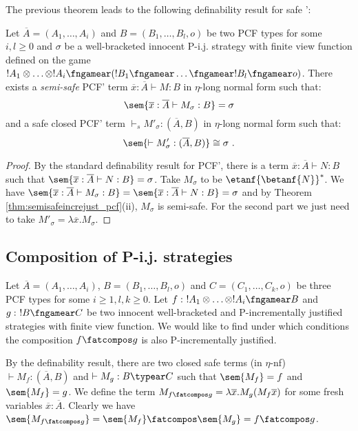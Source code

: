 The previous theorem leads to the following definability result for safe \pcf':
\begin{proposition}
\label{prop:safetydefinability}
Let $\overline{A}=(A_1,\ldots, A_i)$ and $B =(B_1, \ldots, B_l,o)$ be two PCF types for some $i,l\geq 0$ and $\sigma$ be a well-bracketed innocent
P-i.j. strategy with finite view function defined on the game $!A_1 \otimes \ldots \otimes !A_i \fngamear (!B_1 \fngamear \ldots \fngamear !B_l \fngamear o) $. There exists a \emph{semi-safe} PCF' term $\overline{x} : \overline{A} \vdash M : B$ in $\eta$-long normal form such that:
$$ \sem{\overline{x} : \overline{A} \vdash M_\sigma : B} = \sigma $$
and a safe closed PCF' term $\vdash_s M'_\sigma : (\overline{A},B)$ in $\eta$-long normal form such that:
$$ \sem{\vdash M'_\sigma : (\overline{A},B)} \cong \sigma \ .$$
\end{proposition}
\begin{proof}
By the standard definability result for PCF', there is a term $\overline{x} : \overline{A} \vdash N : B$ such that $\sem{\overline{x} :\overline{A} \vdash N : B} = \sigma$.
Take $M_\sigma$ to be $\etanf{\betanf{N}}^* $. We have $\sem{\overline{x} : \overline{A} \vdash M_\sigma : B} =  \sem{\overline{x} :\overline{A} \vdash N : B} = \sigma$ and by Theorem  \ref{thm:semisafeincrejust_pcf}(ii), $M_\sigma$ is semi-safe.
For the second part we just need to take $M'_\sigma = \lambda \overline{x}. M_\sigma$.
\end{proof}


\subsection{Composition of P-i.j. strategies}

Let $\overline{A} = (A_1, \ldots, A_i)$,
$B = (B_1, \ldots, B_l,o)$
and $C=(C_1,\ldots,C_k,o)$ be three PCF types
for some $i\geq 1,l,k\geq 0$. Let
$f:\ !A_1 \otimes \ldots \otimes !A_i \fngamear B$ and $g:\ !B\fngamear C$ be two innocent well-bracketed and P-incrementally justified strategies with finite view function.
We would like to find under which conditions the composition $f\fatcompos g$ is also P-incrementally justified.

By the definability result, there are two closed safe terms (in $\eta$-nf) $\vdash M_f :(\overline{A},B)$  and $\vdash M_g :B \typear C$ such that $\sem{M_f} = f$
and $\sem{M_f} = g$.
We define the term $M_{f\fatcompos g} = \lambda \overline{x} . M_g (M_f \overline{x})$ for some fresh variables $\overline{x} : \overline{A}$. Clearly we have $\sem{M_{f\fatcompos g}} = \sem{M_f} \fatcompos \sem{M_g} = f\fatcompos g$.

